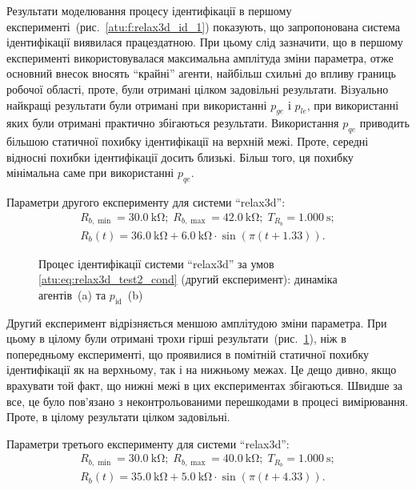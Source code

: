Результати моделювання процесу ідентифікації в першому
експерименті~(рис.~\ref{atu:f:relax3d_id_1}) показують, що запропонована
система ідентифікації виявилася працездатною. При цьому
слід зазначити, що в першому експерименті використовувалася
максимальна амплітуда зміни параметра, отже основний внесок
вносять ``крайні'' агенти, найбільш схильні до впливу границь
робочої області, проте, були отримані цілком задовільні
результати. Візуально найкращі результати були отримані при
використанні
$p_{ge}$ і
$p_{le}$, при використанні яких були отримані практично збігаються
результати. Використання
$p_{qe}$ приводить більшою статичної похибку ідентифікації на
верхній межі. Проте, середні відносні похибки ідентифікації
досить близькі. Більш того, ця похибку мінімальна саме при
використанні $p_{qe}$.



Параметри другого експерименту для системи ``relax3d'':
%
\begin{equation}
  \begin{array}{c}
    R_{b,\min} = \SI{30.0}{\kilo\ohm};
    \;
    R_{b,\max} = \SI{42.0}{\kilo\ohm};
    \;
    T_{R_b} = \SI{1.000}{\second};
  \\
    R_b(t) = \SI{36.0}{\kilo\ohm} + \SI{6.0}{\kilo\ohm} \cdot \sin( \pi ( t + 1.33 ) ).
  \end{array}
  \label{atu:eq:relax3d_test2_cond}
\end{equation}

\begin{figure}[htb!]
  \caption{Процес ідентифікації системи ``relax3d'' за умов \ref{atu:eq:relax3d_test2_cond} (другий експеримент): динаміка агентів~(a) та $p_\mathrm{id}$~(b)}
\label{atu:f:relax3d_id_2}
\end{figure}

Другий експеримент відрізняється меншою амплітудою зміни
параметра. При цьому в цілому були отримані трохи гірші
результати~(рис.~\ref{atu:f:relax3d_id_2}), ніж в попередньому експерименті,
що проявилися в помітній статичної похибку ідентифікації як на
верхньому, так і на нижньому межах. Це дещо дивно, якщо врахувати
той факт, що нижні межі в цих експериментах збігаються. Швидше за
все, це було пов'язано з неконтрольованими перешкодами в процесі
вимірювання. Проте, в цілому результати цілком задовільні.



Параметри третього експерименту для системи ``relax3d'':
%
\begin{equation}
  \begin{array}{c}
    R_{b,\min} = \SI{30.0}{\kilo\ohm};
    \;
    R_{b,\max} = \SI{40.0}{\kilo\ohm};
    \;
    T_{R_b} = \SI{1.000}{\second};
  \\
    R_b(t) = \SI{35.0}{\kilo\ohm} + \SI{5.0}{\kilo\ohm} \cdot \sin( \pi ( t + 4.33 ) ).
  \end{array}
  \label{atu:eq:relax3d_test3_cond}
\end{equation}


